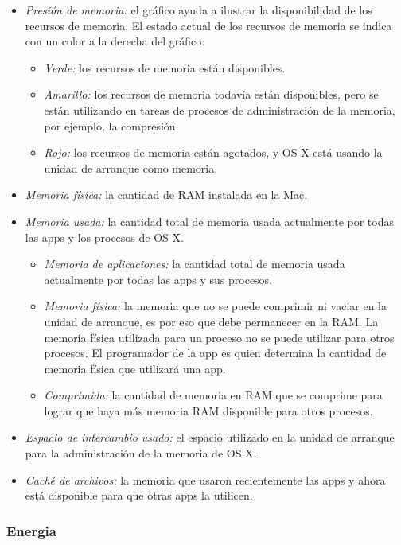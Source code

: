 \documentclass[a4paper,11pt]{article}
\begin{document}
\begin{itemize}
  \item \textit{Presión de memoria:} el gráfico ayuda a ilustrar la disponibilidad de los recursos de memoria. El estado actual de los recursos de memoria se indica con un color a la derecha del gráfico:   
  \begin{itemize}
    \item \textit{Verde:} los recursos de memoria están disponibles. 
    \item \textit{Amarillo:} los recursos de memoria todavía están disponibles, pero se están utilizando en tareas de procesos de administración de la memoria, por ejemplo, la compresión.
    \item \textit{Rojo:} los recursos de memoria están agotados, y OS X está usando la unidad de arranque como memoria. 
  \end{itemize}
  \item \textit{Memoria física:} la cantidad de RAM instalada en la Mac. 
  \item \textit{Memoria usada:} la cantidad total de memoria usada actualmente por todas las apps y los procesos de OS X.
  \begin{itemize}
    \item \textit{Memoria de aplicaciones:} la cantidad total de memoria usada actualmente por todas las apps y sus procesos.
    \item \textit{Memoria física:} la memoria que no se puede comprimir ni vaciar en la unidad de arranque, es por eso que debe permanecer en la RAM. La memoria física utilizada para un proceso no se puede utilizar para otros procesos. El programador de la app es quien determina la cantidad de memoria física que utilizará una app. 
    \item \textit{Comprimida:} la cantidad de memoria en RAM que se comprime para lograr que haya más memoria RAM disponible para otros procesos.
  \end{itemize}
  \item \textit{Espacio de intercambio usado:} el espacio utilizado en la unidad de arranque para la administración de la memoria de OS X.
  \item \textit{Caché de archivos:} la memoria que usaron recientemente las apps y ahora está disponible para que otras apps la utilicen.

\end{itemize}

\subsubsection{Energia}
\end{document}
